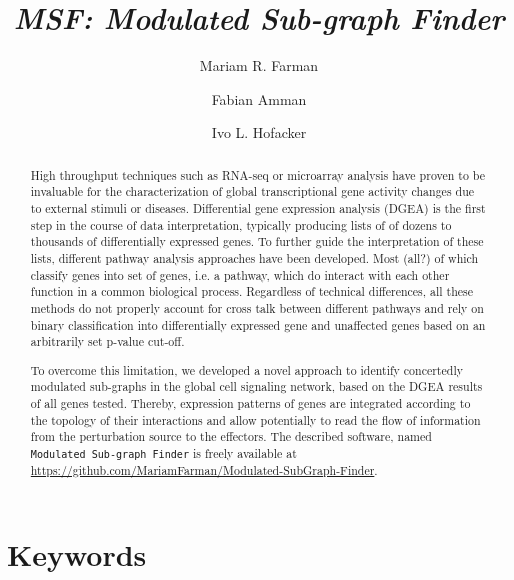 \documentclass[10pt,a4paper,twocolumn]{article}
\newcommand{\TODO}[1]{\begingroup\color{red}#1\endgroup}
\begin{document}
\title{\textit{MSF: Modulated Sub-graph Finder} }

\author[1]{Mariam R. Farman}
\author[1,2]{Fabian Amman}
\author[1]{Ivo L. Hofacker}



\maketitle
\thispagestyle{fancy}

\begin{abstract}

High throughput techniques such as RNA-seq or microarray analysis have
proven to be invaluable for the characterization of global
transcriptional gene activity changes due to external stimuli or
diseases. Differential gene expression analysis (DGEA) is the first
step in the course of data interpretation, typically producing lists
of of dozens to thousands of differentially expressed genes. To
further guide the interpretation of these lists, different pathway
analysis approaches have been developed. Most (\TODO{all?}) of which
classify genes into set of genes, i.e. a pathway, which do interact
with each other function in a common biological process. Regardless of
technical differences, all these methods do not properly account for
cross talk between different pathways and rely on binary
classification into differentially expressed gene and unaffected genes
based on an arbitrarily set p-value cut-off.

To overcome this limitation, we developed a novel approach to identify
concertedly modulated sub-graphs in the global cell signaling network,
based on the DGEA results of all genes tested. Thereby, expression
patterns of genes are integrated according to the topology of their
interactions and allow potentially to read the flow of information
from the perturbation source to the effectors. The described software,
named \texttt{Modulated Sub-graph Finder} is freely available at
\url{https://github.com/MariamFarman/Modulated-SubGraph-Finder}.

\end{abstract}

\section*{Keywords}
\end{document}
